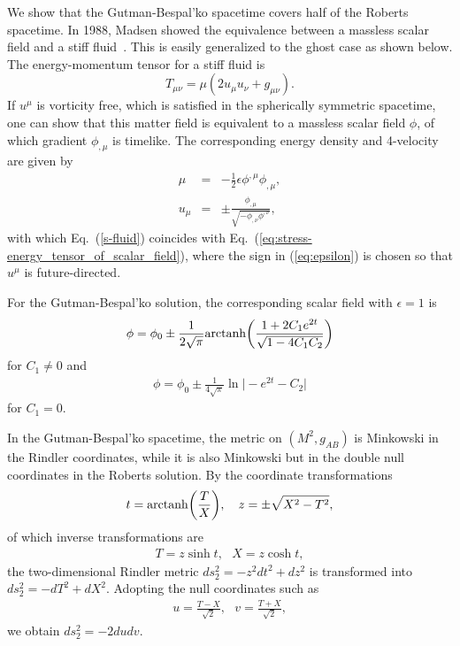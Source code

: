 \documentclass[aps,prd,twocolumn,eqsecnum,showpacs,amsmath]{revtex4}
\begin{document}
We show that the Gutman-Bespal'ko spacetime covers half of the Roberts spacetime.
In 1988, Madsen showed the equivalence between a massless scalar field and a stiff fluid~\cite{madsen1988}.
This is easily generalized to the ghost case as shown below.
The energy-momentum tensor for a stiff fluid is 
\begin{equation}
T_{\mu\nu}=\mu(2u_{\mu}u_{\nu}+g_{\mu\nu}).\label{s-fluid}
\end{equation}
If $u^{\mu}$ is vorticity free, which is satisfied in the spherically symmetric spacetime, one can show that this matter field is equivalent to a massless scalar field $\phi$, of which gradient $\phi_{,\mu}$ is timelike. 
The corresponding energy density and 4-velocity are given by
\begin{eqnarray}
\mu &=& -\frac{1}{2}\epsilon \phi^{,\mu}\phi_{,\mu},\\ 
u_{\mu}&=&\pm \frac{\phi_{,\mu}}{\sqrt{-\phi_{,\nu}\phi^{,\nu}}},\label{eq:epsilon}
\end{eqnarray}
with which Eq.~(\ref{s-fluid}) coincides with Eq.~(\ref{eq:stress-energy_tensor_of_scalar_field}), where the sign in (\ref{eq:epsilon}) is chosen so that $u^{\mu}$ is future-directed.

For the Gutman-Bespal'ko solution, the corresponding scalar field with $\epsilon=1$ is
\begin{eqnarray}
\phi=\phi_0 \pm \frac{1}{2\sqrt{\pi}}{\rm arctanh}\biggl(\frac{1+2C_1e^{2t}}{\sqrt{1-4C_1C_2}}\biggl)
\end{eqnarray}
for $C_1 \ne 0$ and 
\begin{eqnarray}
\phi=\phi_0\pm \frac{1}{4\sqrt{\pi}}\ln\biggl|-e^{2t}-C_2\biggl|
\end{eqnarray}
for $C_1=0$.

In the Gutman-Bespal'ko spacetime, the metric on $(M^2,g_{AB})$ is Minkowski in the Rindler coordinates, while it is also Minkowski but in the double null coordinates in the Roberts solution.
By the coordinate transformations
\begin{eqnarray}
t={\rm arctanh}\biggl(\frac{T}{X}\biggl), ~~~z=\pm \sqrt{X^2-T^2},
\end{eqnarray}
of which inverse transformations are
\begin{eqnarray}
T=z\sinh t, ~~~X=z\cosh t,
\end{eqnarray}
the two-dimensional Rindler metric $ds_2^2=-z^2dt^2+dz^2$ is transformed into $ds_2^2=-dT^2+dX^2$.
Adopting the null coordinates such as
\begin{eqnarray}
u=\frac{T-X}{\sqrt{2}}, ~~~v=\frac{T+X}{\sqrt{2}},
\end{eqnarray}
we obtain $ds_2^2=-2dudv$.
\end{document}
